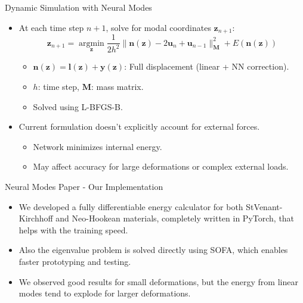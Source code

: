 \documentclass{beamer}
\DeclareMathOperator{\argmin}{argmin}
\begin{document}
\begin{frame}{Dynamic Simulation with Neural Modes}
    \begin{itemize}
        \item At each time step \(n+1\), solve for modal coordinates \(\bm{z}_{n+1}\):
        \begin{equation*}
            \bm{z}_{n+1} = \underset{\bm{z}}{\argmin} \frac{1}{2h^2} \|\bm{n}(\bm{z}) - 2\bm{u}_n + \bm{u}_{n-1}\|_{\bm{M}}^2 + E(\bm{n}(\bm{z}))
        \end{equation*}
        \begin{itemize}
            \item \(\bm{n}(\bm{z}) = \bm{l}(\bm{z}) + \bm{y}(\bm{z})\): Full displacement (linear + NN correction).
            \item \(h\): time step, \(\bm{M}\): mass matrix.
            \item Solved using L-BFGS-B.
        \end{itemize}
        \item  Current formulation doesn't explicitly account for external forces.
        \begin{itemize}
            \item Network minimizes internal energy.
            \item May affect accuracy for large deformations or complex external loads.
        \end{itemize}
    \end{itemize}
\end{frame}

\begin{frame}{Neural Modes Paper - Our Implementation}
    \begin{itemize}
        \item We developed a fully differentiable energy calculator for both StVenant-Kirchhoff and Neo-Hookean materials, completely written in PyTorch, that helps with the training speed.
        \item Also the eigenvalue problem is solved directly using SOFA, which enables faster prototyping and testing.
        \item We observed good results for small deformations, but the energy from linear modes tend to explode for larger deformations.
    \end{itemize}
\end{frame}
\end{document}
